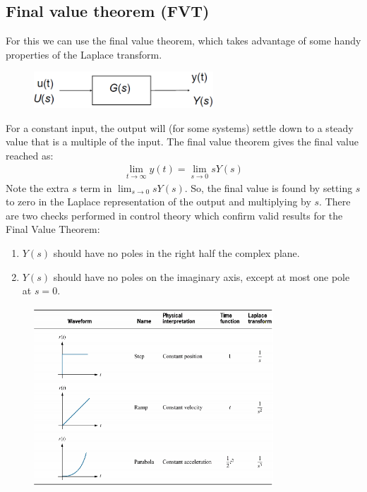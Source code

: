 \documentclass[class=report, crop=false, 12pt,a4paper]{standalone}
\begin{document}
\subsection{Final value theorem (FVT)}
For this we can use the final value theorem, which takes advantage of some handy properties of the Laplace transform. 
\begin{figure}[H]
  \centerline{\includegraphics[width = 0.6\textwidth]{../img/diagram102.png}}
  \caption{}
\end{figure}
For a constant input, the output will (for some systems) settle down to a steady value that is a multiple of the input. The final value theorem gives the final value reached as:
\begin{align}
  \lim_{t\rightarrow \infty} y(t) = \lim_{s\rightarrow 0} s Y(s)
\end{align}
Note the extra $s$ term in $\lim_{s\rightarrow 0} s Y(s)$. So, the final value is found by setting $s$ to zero in the Laplace representation of the output and multiplying by $s$. There are two checks performed in control theory which confirm valid results for the Final Value Theorem:
\begin{enumerate}
  \item $Y(s)$ should have no poles in the right half the complex plane.
  \item $Y(s)$ should have no poles on the imaginary axis, except at most one pole at $s=0$.
\end{enumerate}
\begin{figure}[H]
  \centerline{\includegraphics[width = 0.8\textwidth]{../img/diagram103.png}}
  \caption{}
\end{figure}
\end{document}
